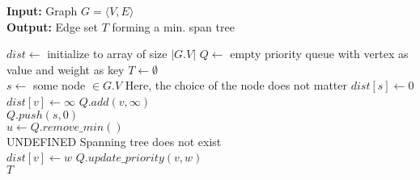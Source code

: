 \documentclass[12pt,a4paper]{article}
\begin{document}
	\begin{algorithm}
		\textbf{Input:} Graph $ G = \langle V, E \rangle $
		\\\textbf{Output:} Edge set $ T $ forming a min. span tree
		\begin{algorithmic}
			\State $ dist \gets $ initialize to array of size $ |G.V| $
			\State $ Q \gets $ empty priority queue with vertex as value and weight as key
			\State $ T \gets \emptyset $
			\\
			\State $ s \gets $ some node $ \in G.V $ \Comment Here, the choice of the node does not matter
			\State $ dist[s] \gets 0 $
			\\
				\State $ dist[v] \gets \infty $
					\State $ Q.add(v, \infty) $
				\EndIf
			\EndFor
			\\
			\State $ Q.push(s, 0) $
			\\
				\State $ u \gets Q.remove\_min() $
				\\
					\State \Return UNDEFINED \Comment Spanning tree does not exist
				\EndIf
				\\
						\State $ dist[v] \gets w $
						\State $ Q.update\_priority(v, w) $
				\EndIf
				\EndFor
			\EndWhile
			\\
			\Return $ T $
			\EndProcedure
		\end{algorithmic}
	\end{algorithm}
\end{document}

